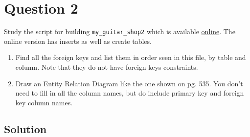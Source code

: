 
\section*{Question 2}

Study the script for building \texttt{my\_guitar\_shop2} which is available \href{book\_apps/\_create\_db.sql}{online}.
The online version has inserts as well as create tables.

\begin{enumerate}[label=(\alph*)]
\item Find all the foreign keys and list them in order seen in this file, by table and column.
Note that they do not have foreign keys constraints.
\item  Draw an Entity Relation Diagram like the one shown on pg. 535.
You don't need to fill in all the column names, but do include primary key and foreign key column names.
\end{enumerate}

\subsection*{Solution}

